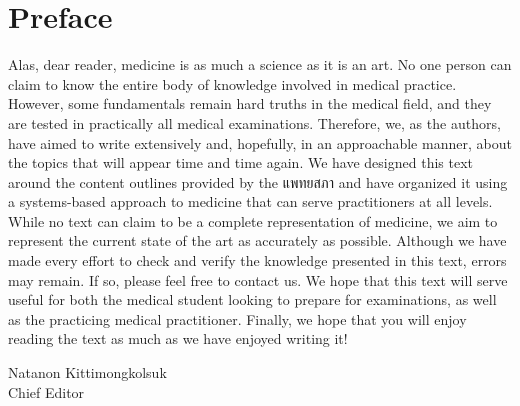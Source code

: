 \documentclass[
    secnumdepth=1,
]{template/kaobook}
\begin{document}
\dedication{
    ความสำเร็จที่แท้จริง ไม่ใช่แค่การเรียนรู้ แต่อยู่ที่การนำไปประยุกต์ใช้ให้เกิดประโยชน์ต่อมวลมนุษยชาติ\\
    \flushright--- สมเด็จพระมหิตลาธิเบศร อดุลยเดชวิกรม พระบรมราชชนก
}


\makecoverpage%
\makeatletter
\@mainmatterfalse%
\makeatother
\makecopyrightpage%
\makededicationpage%


\chapter*{Preface}
Alas, dear reader, medicine is as much a science as it is an art. No one person can claim to know the entire body of knowledge involved in medical practice. However, some fundamentals remain hard truths in the medical field, and they are tested in practically all medical examinations. Therefore, we, as the authors, have aimed to write extensively and, hopefully, in an approachable manner, about the topics that will appear time and time again. We have designed this text around the content outlines provided by the แพทยสภา and have organized it using a systems-based approach to medicine that can serve practitioners at all levels. While no text can claim to be a complete representation of medicine, we aim to represent the current state of the art as accurately as possible. Although we have made every effort to check and verify the knowledge presented in this text, errors may remain. If so, please feel free to contact us. We hope that this text will serve useful for both the medical student looking to prepare for examinations, as well as the practicing medical practitioner. Finally, we hope that you will enjoy reading the text as much as we have enjoyed writing it!

\begin{flushright}
Natanon Kittimongkolsuk\\
Chief Editor
\end{flushright}

\end{document}
